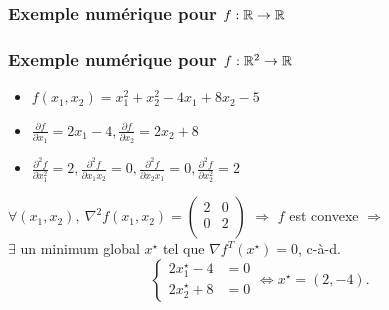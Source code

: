 \documentclass{beamer}
\newcommand{\R}{{\ensuremath\mathbb{R}}}
\begin{document}
\begin{frame}
  \frametitle{Exemple numérique pour $f:\R \rightarrow \R$}

  
\end{frame}

\begin{frame}
  \frametitle{Exemple numérique pour $f:\R^2 \rightarrow \R$}

  \begin{itemize}
  \item $f(x_1,x_2) = x_1^2 + x_2^2 - 4x_1 + 8x_2 - 5$
  \item $\frac{\partial f}{\partial x_1} = 2x_1 - 4, \frac{\partial f}{\partial x_2} = 2x_2 + 8$
  \item $\frac{\partial^2 f}{\partial x_1^2} = 2, \frac{\partial^2 f}{\partial x_1x_2} = 0, \frac{\partial^2 f}{\partial x_2x_1} = 0, \frac{\partial^2 f}{\partial x_2^2} = 2$
  \end{itemize}

  
  $\forall (x_1,x_2), \ \nabla^2f(x_1,x_2) =
  \left(\begin{array}{cc}
    2 & 0 \\
    0 & 2 \\
  \end{array}
  \right)
  $ $\Rightarrow$ $f$ est convexe $\Rightarrow$ \\
  $\exists$ un minimum global $x^\star$ tel que ${\nabla f}^T(x^\star) = 0$, c-à-d.
  \[
  \left\{
  \begin{array}{ll}
    2x^\star_1 - 4 & = 0\\
    2x^\star_2 + 8 & = 0
  \end{array}
  \right.
  \Leftrightarrow x^\star = (2,-4).
  \]
  
\end{frame}
\end{document}
